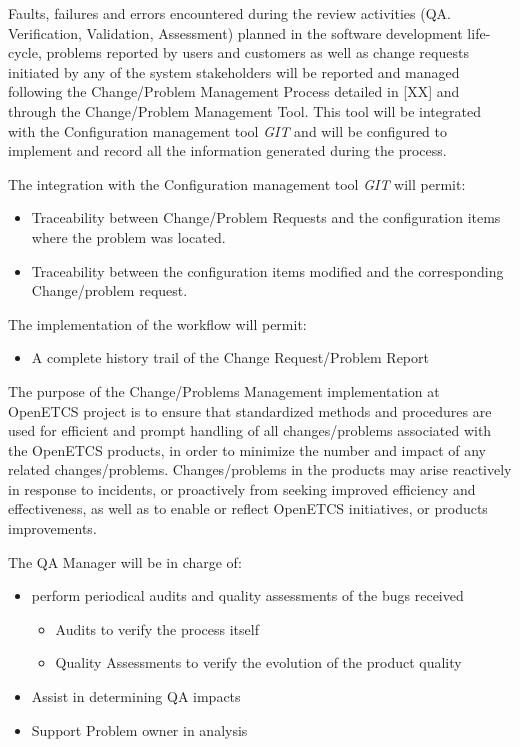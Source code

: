 \documentclass{template/openetcs_article}
\begin{document}
Faults, failures and errors encountered during the review activities (QA. Verification, Validation, Assessment) planned in the software development life-cycle, problems reported by users and customers as well as change requests initiated by any of the system stakeholders will be reported and managed following the Change/Problem Management Process  \citep{emp} detailed in [XX] and through the Change/Problem Management Tool. This tool will be integrated with the Configuration management tool {\it GIT} and will be configured to implement and record all the information generated during the process.

The integration with the Configuration management tool {\it GIT} will permit:
\begin{itemize}
\item Traceability between Change/Problem Requests and the configuration items where the problem was located.
\item Traceability between the configuration items modified and the corresponding Change/problem request. 
\end{itemize}
 
The implementation of the workflow will permit:
\begin{itemize}
\item A complete history trail of the Change Request/Problem Report
\end{itemize}

The purpose of the Change/Problems Management implementation at OpenETCS project is to ensure that standardized methods and procedures are used for efficient and prompt handling of all changes/problems associated with the OpenETCS products, in order to minimize the number and impact of any related changes/problems. Changes/problems in the products may arise reactively in response to incidents, or proactively from seeking improved efficiency and effectiveness, as well as to enable or reflect OpenETCS initiatives, or products improvements.

The QA Manager will be in charge of:
\begin{itemize}
\item perform periodical audits and quality assessments of the bugs received
\begin{itemize}
\item Audits to verify the process itself
\item Quality Assessments to verify the evolution of the product quality
\end{itemize}
\item Assist in determining QA impacts
\item Support Problem owner in analysis
\end{itemize}
\end{document}
